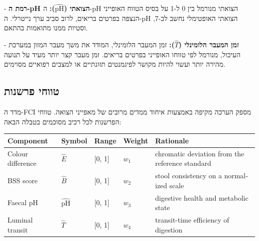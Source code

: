 \begin{hebrew}- \textbf{רמת ה-\textenglish{pH} הצואתי ($\widehat{\mathrm{pH}}$):} ה-\textenglish{pH} הצואתי מנורמל בין 0 ל-1 על בסיס הטווח האופייני הנצפה בפרטים בריאים, לרוב סביב ערך נייטרלי. ה-\textenglish{pH} הצואתי האופטימלי נחשב לכ-7, וסטיות ממנו מתואמות בהתאם.\end{hebrew}

\begin{hebrew}- \textbf{זמן המעבר הלומינלי ($\hat{T}$):} זמן המעבר הלומינלי, המודד את משך מעבר המזון במערכת העיכול, מנורמל לפי טווחו האופייני בפרטים בריאים. זמן מעבר קצר יותר מעיד על תנועה מהירה יותר ועשוי להיות מקושר לפיגמנטים תזונתיים או למצבים רפואיים מסוימים.\end{hebrew}

\subsection{\texthebrew{טווחי פרשנות}}

\begin{hebrew}מדד ה-\textenglish{FCI} מספק הערכה מקיפה באמצעות איחוד ממדים מרובים של מאפייני הצואה. טווחי הפרשנות לכל רכיב מסוכמים בטבלה הבאה:\end{hebrew}

\begin{table}[h]\centering\small
\setlength{\tabcolsep}{3pt}
\begin{tabular}{lllll}
\toprule
\textenglish{Component} & \textenglish{Symbol} & \textenglish{Range} & \textenglish{Weight} & \textenglish{Rationale} \\
\midrule
\textenglish{Colour difference} & \textenglish{$\hat{E}$} & \textenglish{[0, 1]} & \textenglish{$w_1$} & \textenglish{chromatic deviation from the reference standard} \\
\textenglish{BSS score} & \textenglish{$\hat{B}$} & \textenglish{[0, 1]} & \textenglish{$w_2$} & \textenglish{stool consistency on a normalized scale} \\
\textenglish{Faecal pH} & \textenglish{$\widehat{\mathrm{pH}}$} & \textenglish{[0, 1]} & \textenglish{$w_3$} & \textenglish{digestive health and metabolic state} \\
\textenglish{Luminal transit} & \textenglish{$\hat{T}$} & \textenglish{[0, 1]} & \textenglish{$w_4$} & \textenglish{transit-time efficiency of digestion} \\
\bottomrule
\end{tabular}
\end{table}

